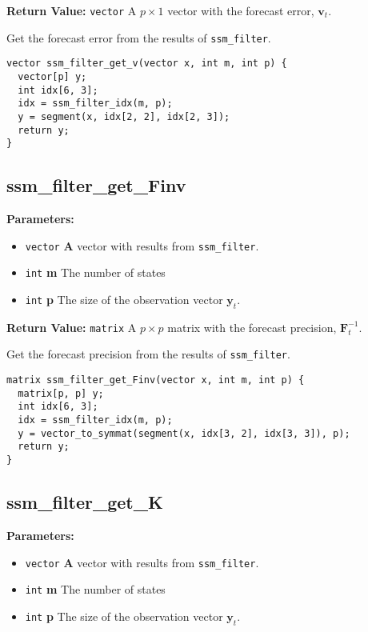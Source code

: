 \documentclass[]{book}
\providecommand{\tightlist}{%
  \setlength{\itemsep}{0pt}\setlength{\parskip}{0pt}}
\newcommand{\mat}[1]{\boldsymbol{#1}}
\renewcommand{\vec}[1]{\boldsymbol{#1}}
\begin{document}
\textbf{Return Value:} \texttt{vector} A \(p \times 1\) vector with the
forecast error, \(\vec{v}_t\).

Get the forecast error from the results of \texttt{ssm\_filter}.

\begin{verbatim}
vector ssm_filter_get_v(vector x, int m, int p) {
  vector[p] y;
  int idx[6, 3];
  idx = ssm_filter_idx(m, p);
  y = segment(x, idx[2, 2], idx[2, 3]);
  return y;
}
\end{verbatim}

\subsection{ssm\_filter\_get\_Finv}\label{ssmux5ffilterux5fgetux5ffinv}

\textbf{Parameters:}

\begin{itemize}
\tightlist
\item
  \texttt{vector} \textbf{A} vector with results from
  \texttt{ssm\_filter}.
\item
  \texttt{int} \textbf{m} The number of states
\item
  \texttt{int} \textbf{p} The size of the observation vector
  \(\vec{y}_t\).
\end{itemize}

\textbf{Return Value:} \texttt{matrix} A \(p \times p\) matrix with the
forecast precision, \(\mat{F}^{-1}_t\).

Get the forecast precision from the results of \texttt{ssm\_filter}.

\begin{verbatim}
matrix ssm_filter_get_Finv(vector x, int m, int p) {
  matrix[p, p] y;
  int idx[6, 3];
  idx = ssm_filter_idx(m, p);
  y = vector_to_symmat(segment(x, idx[3, 2], idx[3, 3]), p);
  return y;
}
\end{verbatim}

\subsection{ssm\_filter\_get\_K}\label{ssmux5ffilterux5fgetux5fk}

\textbf{Parameters:}

\begin{itemize}
\tightlist
\item
  \texttt{vector} \textbf{A} vector with results from
  \texttt{ssm\_filter}.
\item
  \texttt{int} \textbf{m} The number of states
\item
  \texttt{int} \textbf{p} The size of the observation vector
  \(\vec{y}_t\).
\end{itemize}
\end{document}
